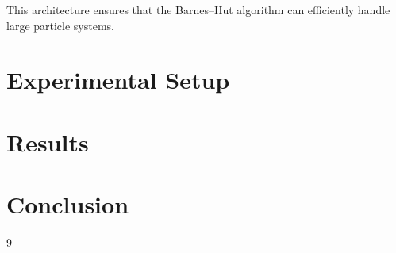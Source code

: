 This architecture ensures that the Barnes--Hut algorithm can efficiently handle large particle systems.
\section{Experimental Setup}

\section{Results}


\section{Conclusion}

\begin{thebibliography}{9}

\end{thebibliography}

